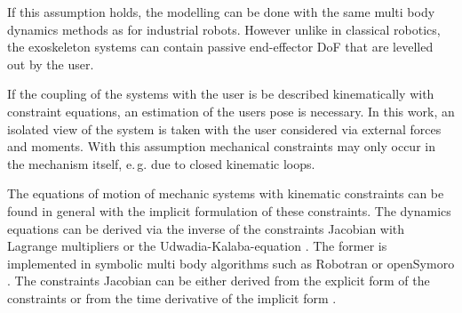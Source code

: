 \documentclass[letterpaper, 10 pt, conference]{ieeeconf}  %
\begin{document}
If this assumption holds, the modelling can be done with the same multi body dynamics methods as for industrial robots.
However unlike in classical robotics, the exoskeleton systems can contain passive end-effector DoF that are levelled out by the user.

If the coupling of the systems with the user is be described kinematically with constraint equations, an estimation of the users pose is necessary.
In this work, an isolated view of the system is taken with the user considered via external forces and moments.
%
With this assumption mechanical constraints may only occur in the mechanism itself, e.\,g. due to closed kinematic loops.


The equations of motion of mechanic systems with kinematic constraints can be found in general with the implicit formulation of these constraints.
The dynamics equations can be derived via the inverse of the constraints Jacobian with Lagrange multipliers \cite{NakamuraGho1989} or the Udwadia-Kalaba-equation \cite{UdwadiaKal1992}.
The former is implemented in symbolic multi body algorithms such as Robotran \cite{SaminFis2013} or openSymoro \cite{KhalilVijKhoMuk2014}.
The constraints Jacobian can be either derived from the explicit form of the constraints \cite{NakamuraGho1989} or from the time derivative of the implicit form \cite{ParkChoPlo1999}.
\end{document}
